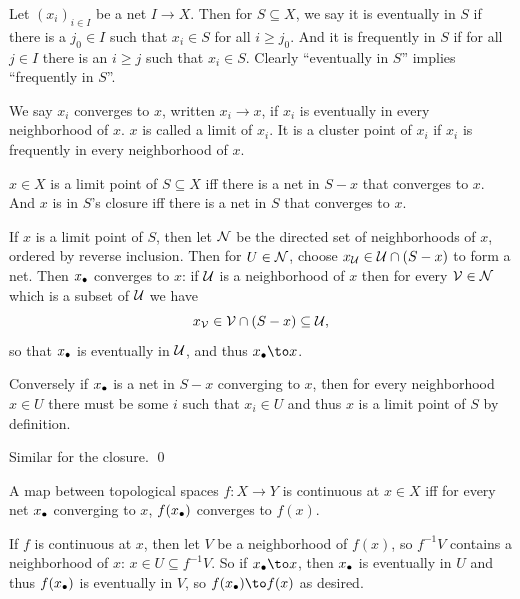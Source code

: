     Let $(x_i)_{i\in I}$ be a net $I\to X$.
    Then for $S\subseteq X$, we say it is {\emphcolor eventually in $S$} if there is a $j_0\in I$ such that $x_i\in S$ for all $i\geq j_0$.
    And it is {\emphcolor frequently in $S$} if for all $j\in I$ there is an $i\geq j$ such that $x_i\in S$.
    Clearly ``eventually in $S$'' implies ``frequently in $S$''.

    We say $x_i$ {\emphcolor converges} to $x$, written $x_i\to x$, if $x_i$ is eventually in every neighborhood of $x$.
    $x$ is called a {\emphcolor limit} of $x_i$.
    It is a {\emphcolor cluster point} of $x_i$ if $x_i$ is frequently in every neighborhood of $x$.

\edefn

\bprop

    $x\in X$ is a limit point of $S\subseteq X$ iff there is a net in $S-x$ that converges to $x$.
    And $x$ is in $S$'s closure iff there is a net in $S$ that converges to $x$.

\eprop

\bproof

    If $x$ is a limit point of $S$, then let ${{\cal N}}$ be the directed set of neighborhoods of $x$, ordered by reverse inclusion.
    Then for $U\in{{\cal N}}$, choose $x_{{\cal U}}\in{{\cal U}}\cap(S-x)$ to form a net.
    Then $x_\bullet$ converges to $x$: if ${{\cal U}}$ is a neighborhood of $x$ then for every ${{\cal V}}\in{{\cal N}}$ which is a subset of ${{\cal U}}$ we have
    $$ x_{{\cal V}} \in {{\cal V}}\cap(S-x) \subseteq {{\cal U}} , $$
    so that $x_\bullet$ is eventually in ${{\cal U}}$, and thus $x_\bul\to x$.

    Conversely if $x_\bullet$ is a net in $S-x$ converging to $x$, then for every neighborhood $x\in U$ there must be some $i$ such that $x_i\in U$
    and thus $x$ is a limit point of $S$ by definition.

    Similar for the closure.
    \qed

\eproof

\bprop

    A map between topological spaces $f\colon X\to Y$ is continuous at $x\in X$ iff for every net $x_\bullet$ converging to $x$, $f(x_\bullet)$ converges to $f(x)$.

\eprop

\bproof

    If $f$ is continuous at $x$, then let $V$ be a neighborhood of $f(x)$, so $f^{-1}V$ contains a neighborhood of $x$: $x\in U\subseteq f^{-1}V$.
    So if $x_\bul\to x$, then $x_\bullet$ is eventually in $U$ and thus $f(x_\bullet)$ is eventually in $V$, so $f(x_\bul)\to f(x)$ as desired.

